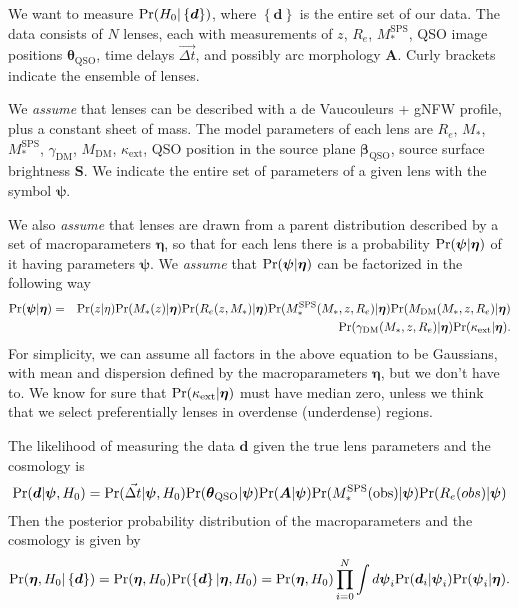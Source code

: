 \documentclass[letter]{article}
\def\pr{{\rm Pr}}
\def\reff{R_e}
\def\msps{M_*^{\mathrm{SPS}}}
\def\mdm{M_{\mathrm{DM}}}
\def\gammadm{\gamma_{\mathrm{DM}}}
\begin{document}
We want to measure $\pr(H_0|\left\{\boldsymbol{d}\right\})$, where $\left\{\boldsymbol{d}\right\}$ is the entire set of our data.
The data consists of $N$ lenses, each with measurements of $z$, $\reff$, $\msps$, QSO image positions $\boldsymbol{\theta}_{\mathrm{QSO}}$, time delays $\vec{\Delta t}$, and possibly arc morphology $\boldsymbol{A}$.
Curly brackets indicate the ensemble of lenses.

We {\em assume} that lenses can be described with a de Vaucouleurs + gNFW profile, plus a constant sheet of mass.
The model parameters of each lens are $\reff$, $M_*$, $\msps$, $\gammadm$, $\mdm$, $\kappa_{\mathrm{ext}}$, QSO position in the source plane $\boldsymbol{\beta}_{\mathrm{QSO}}$, source surface brightness $\boldsymbol{S}$. We indicate the entire set of parameters of a given lens with the symbol $\boldsymbol{\psi}$.

We also {\em assume} that lenses are drawn from a parent distribution described by a set of macroparameters $\boldsymbol{\eta}$, so that for each lens there is a probability $\pr(\boldsymbol{\psi}|\boldsymbol{\eta})$ of it having parameters $\boldsymbol{\psi}$. We {\em assume} that $\pr(\boldsymbol{\psi}|\boldsymbol{\eta})$ can be factorized in the following way
\begin{eqnarray}
\pr(\boldsymbol{\psi}|\boldsymbol{\eta}) = & & \pr(z|\eta)\pr(M_*(z)|\boldsymbol{\eta})\pr(\reff(z,M_*)|\boldsymbol{\eta})\pr(\msps(M_*,z,\reff)|\boldsymbol{\eta})\pr(\mdm(M_*,z,\reff)|\boldsymbol{\eta}) \nonumber \\
& & \pr(\gammadm(M_*,z,\reff)|\boldsymbol{\eta})\pr(\kappa_{\mathrm{ext}}|\boldsymbol{\eta}).
\end{eqnarray}
For simplicity, we can assume all factors in the above equation to be Gaussians, with mean and dispersion defined by the macroparameters $\boldsymbol{\eta}$, but we don't have to.
We know for sure that $\pr(\kappa_{\mathrm{ext}}|\boldsymbol{\eta})$ must have median zero, unless we think that we select preferentially lenses in overdense (underdense) regions.

The likelihood of measuring the data $\boldsymbol{d}$ given the true lens parameters and the cosmology is
\begin{equation}
\pr(\boldsymbol{d}|\boldsymbol{\psi},H_0) = \pr(\vec{\Delta t}|\boldsymbol{\psi},H_0)\pr(\boldsymbol{\theta}_{\mathrm{QSO}}|\boldsymbol{\psi})\pr(\boldsymbol{A}|\boldsymbol{\psi})\pr(\msps(\mathrm{obs})|\boldsymbol{\psi})\pr(\reff(obs)|\boldsymbol{\psi})
\end{equation}
Then the posterior probability distribution of the macroparameters and the cosmology is given by
\begin{equation}
\pr(\boldsymbol{\eta},H_0|\left\{\boldsymbol{d}\right\}) = \pr(\boldsymbol{\eta},H_0) \pr(\left\{\boldsymbol{d}\right\}|\boldsymbol{\eta},H_0) = \pr(\boldsymbol{\eta},H_0) \prod_{i=0}^N \int d\boldsymbol{\psi}_i \pr(\boldsymbol{d}_i|\boldsymbol{\psi}_i)\pr(\boldsymbol{\psi}_i|\boldsymbol{\eta}).
\end{equation}
\end{document}
